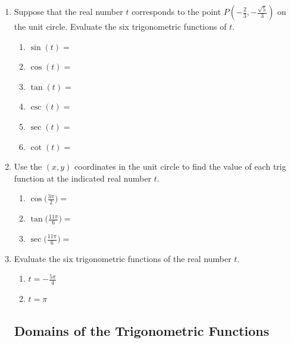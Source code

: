 \begin{enumerate}
\item Suppose that the real number $t$ corresponds to the point $P(-\frac{2}{3},-\frac{\sqrt{5}}{3})$ on the unit circle.  Evaluate the six trigonometric functions of $t$.
\begin{enumerate}
\item $\sin(t)=$\\[.5in]
\item $\cos(t)=$ \\[.5in]
\item $\tan(t)=$ \\[.5in]
\item $\csc(t)=$ \\[.5in]
\item $\sec(t)=$ \\[.5in]
\item $\cot(t)=$ \\[.5in]
\end{enumerate}


\item Use the $(x,y)$ coordinates in the unit circle to find the value of each trig function at the indicated real number $t$.\\

\begin{enumerate}
\item $\displaystyle \cos\Big(\frac{3\pi}{2}\Big)=$\\[.2in]
\item $\displaystyle \tan\Big(\frac{11\pi}{6}\Big)=$\\[.5in]
\item $\displaystyle \sec\Big(\frac{11\pi}{6}\Big)=$\\[.5in]

\end{enumerate}

\item Evaluate the six trigonometric functions of the real number $t$.
\begin{enumerate}

\item $\displaystyle t=-\frac{5\pi}{4}$\vfill
\item $\displaystyle t=\pi$\vfill

\end{enumerate}


\newpage

\subsection{Domains of the Trigonometric Functions} ~

\vfill



\end{enumerate}





